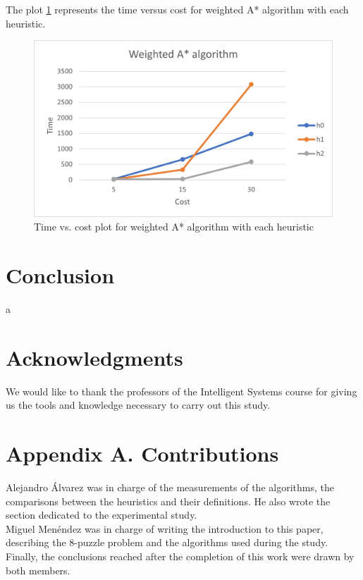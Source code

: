 \documentclass[runningheads]{llncs}
\begin{document}
The plot \ref{fig:wastar} represents the time versus cost for weighted A* algorithm with each heuristic.
\begin{figure}[H]
    \centering
    \includegraphics{WeightedAStarTimes.jpg}
    \caption{Time vs. cost plot for weighted A* algorithm with each heuristic}
    \label{fig:wastar}
\end{figure}

\section{Conclusion}
a
\section*{Acknowledgments}
We would like to thank the professors of the Intelligent Systems course for giving us the tools and knowledge necessary to carry out this study.
\section*{Appendix A. Contributions}
Alejandro Álvarez was in charge of the measurements of the algorithms, the comparisons between the heuristics and their definitions. He also wrote the section dedicated to the experimental study.
\\
Miguel Menéndez was in charge of writing the introduction to this paper, describing the 8-puzzle problem and the algorithms used during the study.
\\
Finally, the conclusions reached after the completion of this work were drawn by both members.
\end{document}
